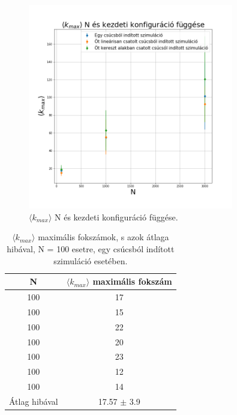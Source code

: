 \documentclass[a4paper, 12pt]{article}
\numberwithin{equation}{section}          %
\numberwithin{figure}{subsection}
\begin{document}
\begin{figure}[ht!]
	\begin{center}
		\includegraphics[width=0.8\textwidth]{kmax.png}
	\end{center}
	\caption{$\langle k_{max} \rangle$ N és kezdeti konfiguráció függése.}
	\label{Ka}
\end{figure}

\clearpage

\begin{table}[ht!]
	\captionsetup{justification=centering}
	\begin{center}
		\begin{tabular}{||c|c||}
			\hline
			N & $\langle k_{max} \rangle$ maximális fokszám \\  \hline
			100 & 17 \\	\hline
			100 &15 \\	\hline
			100 & 22\\	\hline
			100 & 20\\	\hline
			100 & 23\\	\hline
			100 & 12\\	\hline
			100 & 14 \\	\hline
			Átlag hibával & 17.57 $\pm$ 3.9\\  \hline
		\end{tabular}
		\caption{$\langle k_{max} \rangle$ maximális fokszámok, s azok átlaga hibával, N = 100 esetre, egy csúcsból indított
			szimuláció esetében.}
	\end{center}
\end{table}
\end{document}
